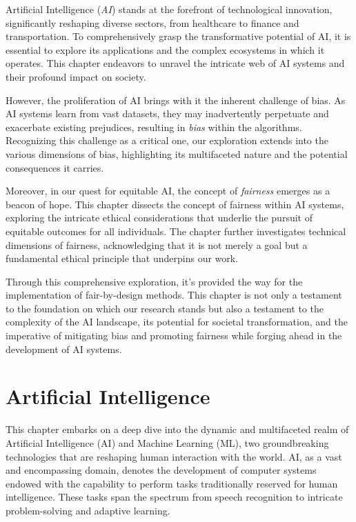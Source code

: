 \documentclass[12pt,a4paper,openright,twoside]{book}
\begin{document}
Artificial Intelligence (\emph{AI}) stands at the forefront of technological innovation, significantly reshaping diverse sectors, from healthcare to finance and transportation. To comprehensively grasp the transformative potential of AI, it is essential to explore its applications and the complex ecosystems in which it operates. This chapter endeavors to unravel the intricate web of AI systems and their profound impact on society.

However, the proliferation of AI brings with it the inherent challenge of bias. As AI systems learn from vast datasets, they may inadvertently perpetuate and exacerbate existing prejudices, resulting in \emph{bias} within the algorithms. Recognizing this challenge as a critical one, our exploration extends into the various dimensions of bias, highlighting its multifaceted nature and the potential consequences it carries. 

Moreover, in our quest for equitable AI, the concept of \emph{fairness} emerges as a beacon of hope. This chapter dissects the concept of fairness within AI systems, exploring the intricate ethical considerations that underlie the pursuit of equitable outcomes for all individuals. The chapter further investigates technical dimensions of fairness, acknowledging that it is not merely a goal but a fundamental ethical principle that underpins our work. 

Through this comprehensive exploration, it's provided the way for the implementation of fair-by-design methods. This chapter is not only a testament to the foundation on which our research stands but also a testament to the complexity of the AI landscape, its potential for societal transformation, and the imperative of mitigating bias and promoting fairness while forging ahead in the development of AI systems. 


\section{Artificial Intelligence}

This chapter embarks on a deep dive into the dynamic and multifaceted realm of Artificial Intelligence (AI) and Machine Learning (ML), two groundbreaking technologies that are reshaping human interaction with the world. AI, as a vast and encompassing domain, denotes the development of computer systems endowed with the capability to perform tasks traditionally reserved for human intelligence. These tasks span the spectrum from speech recognition to intricate problem-solving and adaptive learning. 
\end{document}
